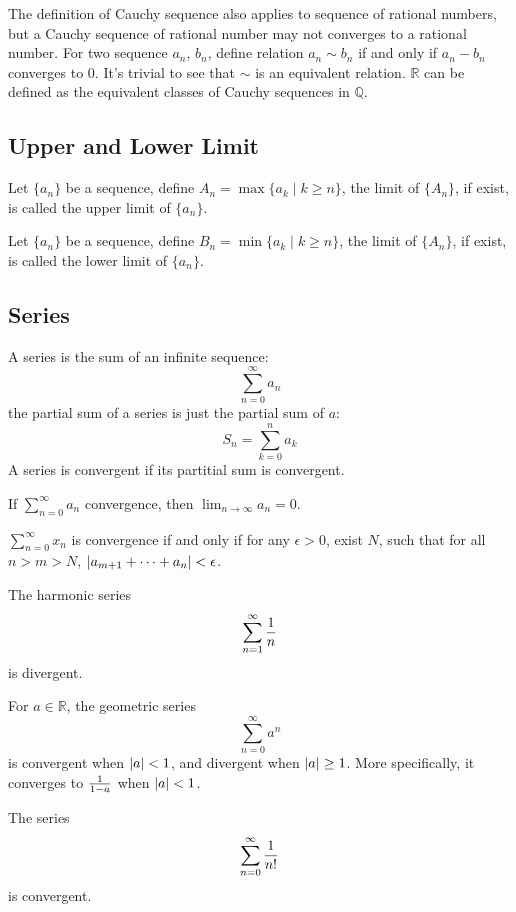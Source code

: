 The definition of Cauchy sequence also applies to sequence of rational numbers,
but a Cauchy sequence of rational number may not converges to a rational number.
For two sequence $a_n$, $b_n$, define relation $a_n \sim b_n$ if and only if
$a_n - b_n$ converges to $0$.
It's trivial to see that $\sim$ is an equivalent relation.
$\mathbb R$ can be defined as the equivalent classes of Cauchy sequences in $\mathbb Q$.

\subsection{Upper and Lower Limit}

\begin{defi}
Let $\{a_n\}$ be a sequence, define $A_n = \max\{a_k \mid k \geq n\}$,
the limit of $\{A_n\}$, if exist, is called the upper limit of $\{a_n\}$.
\end{defi}

\begin{defi}
Let $\{a_n\}$ be a sequence, define $B_n = \min\{a_k \mid k \geq n\}$,
the limit of $\{A_n\}$, if exist, is called the lower limit of $\{a_n\}$.
\end{defi}


\subsection{Series}
A series is the sum of an infinite sequence: $$\sum_{n=0}^\infty a_n$$
the partial sum of a series is just the partial sum of $a$:
$$S_n = \sum_{k=0}^n a_k$$
A series is convergent if its partitial sum is convergent.
\begin{pro}
If $\sum_{n=0}^\infty a_n$ convergence, then $\lim_{n \to \infty} a_n = 0$.
\end{pro}

\begin{pro}
$\sum_{n=0}^\infty x_n$ is convergence if and only if for any $\epsilon > 0$,
exist $N$, such that for all $n > m > N$, $\left| {a_{m+1} + \cdots + a_n} \right| < \epsilon$.
\end{pro}

\begin{pro}
The harmonic series $$\sum_{n=1}^\infty {1 \over n}$$ is divergent.
\end{pro}

\begin{pro}
For $a \in \mathbb R$, the geometric series $$\sum_{n=0}^\infty a^n$$ is
convergent when $\left| {a} \right| < 1$, and divergent when $\left| {a} \right| \geq 1$.
More specifically, it converges to $1 \over 1 - a$ when $\left| {a} \right| < 1$.
\end{pro}

\begin{pro}
The series $$\sum_{n=0}^\infty {1 \over n!}$$ is convergent.
\end{pro}
